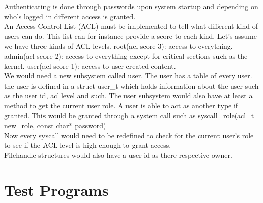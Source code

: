 \documentclass[12pt]{article}
\begin{document}
Authenticating is done through passwords upon system startup and depending on who's logged in different access is granted. \\

An Access Control List (ACL) must be implemented to tell what different kind of users can do. This list can for instance provide a score to each kind.  Let's assume we have three kinds of ACL levels. root(acl score 3): access to everything. admin(acl score 2): access to everything except for critical sections such as the kernel. user(acl score 1): access to user created content. \\

We would need a new subsystem called user. The user has a table of every user. the user is defined in a struct user\_t which holds information about the user such as the user id, acl level and such. The user subsystem would also have at least a method to get the current user role. A user is able to act as another type if granted. This would be granted through a system call such as syscall\_role(acl\_t new\_role, const char* password)\\

Now every syscall would need to be redefined to check for the current user's role to see if the ACL level is high enough to grant access. \\

Filehandle structures would also have a user id as there respective owner.

\newpage

\appendix
\section{Test Programs}
\end{document}
